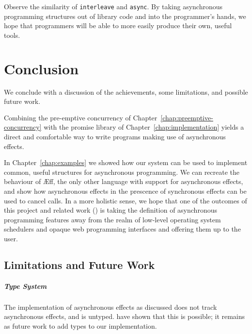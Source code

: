 \documentclass[msc,deptreport,cs]{infthesis} %
\newcommand{\code}[1]{\lstinline{#1}}
\newcommand\aeff{{\AE}ff\xspace}
\newcommand{\todo}[1]
           {{\par\noindent\small\color{RoyalPurple}
  \framebox{\parbox{\dimexpr\linewidth-2\fboxsep-2\fboxrule}
    {\textbf{TODO:} #1}}}}
\begin{document}

Observe the similarity of \code{interleave} and \code{async}. By taking
asynchronous programming structures out of library code and into the
programmer's hands, we hope that programmers will be able to more easily produce
their own, useful tools.


\chapter{Conclusion}
\label{chap:conclusion}

We conclude with a discussion of the achievements, some limitations, and
possible future work.

Combining the pre-emptive concurrency of
Chapter~\ref{chap:preemptive-concurrency} with the promise library of
Chapter~\ref{chap:implementation} yields a direct and comfortable way to write
programs making use of asynchronous effects.

In Chapter~\ref{chap:examples} we showed how our system can be used to implement
common, useful structures for asynchronous programming. We can recreate the
behaviour of \aeff, the only other language with support for asynchronous
effects, and show how asynchronous effects in the prescence of synchronous
effects can be used to cancel calls.
%
In a more holistic sense, we hope that one of the outcomes of this project and
related work (\cite{ahman2020asynchronous, leijen2017structured,
  dolan2017concurrent}) is taking the definition of asynchronous programming
features away from the realm of low-level operating system schedulers and opaque
web programming interfaces and offering them up to the user.



\section{Limitations and Future Work}

\paragraph*{Type System}
The implementation of asynchronous effects as discussed does not track
asynchronous effects, and is untyped. \citeauthor{ahman2020asynchronous} have
shown that this is possible; it remains as future work to add types to our
implementation.
\end{document}
